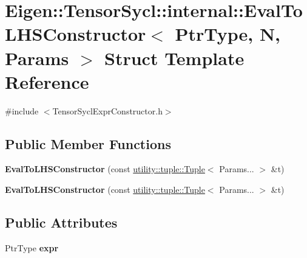 \hypertarget{struct_eigen_1_1_tensor_sycl_1_1internal_1_1_eval_to_l_h_s_constructor}{}\section{Eigen\+:\+:Tensor\+Sycl\+:\+:internal\+:\+:Eval\+To\+L\+H\+S\+Constructor$<$ Ptr\+Type, N, Params $>$ Struct Template Reference}
\label{struct_eigen_1_1_tensor_sycl_1_1internal_1_1_eval_to_l_h_s_constructor}


{\ttfamily \#include $<$Tensor\+Sycl\+Expr\+Constructor.\+h$>$}

\subsection*{Public Member Functions}
\begin{DoxyCompactItemize}
\item 
\mbox{\label{struct_eigen_1_1_tensor_sycl_1_1internal_1_1_eval_to_l_h_s_constructor_a78dfdb034a54038d757bf0cc6db8647e}} 
{\bfseries Eval\+To\+L\+H\+S\+Constructor} (const \hyperlink{structutility_1_1tuple_1_1_tuple}{utility\+::tuple\+::\+Tuple}$<$ Params... $>$ \&t)
\item 
\mbox{\label{struct_eigen_1_1_tensor_sycl_1_1internal_1_1_eval_to_l_h_s_constructor_a78dfdb034a54038d757bf0cc6db8647e}} 
{\bfseries Eval\+To\+L\+H\+S\+Constructor} (const \hyperlink{structutility_1_1tuple_1_1_tuple}{utility\+::tuple\+::\+Tuple}$<$ Params... $>$ \&t)
\end{DoxyCompactItemize}
\subsection*{Public Attributes}
\begin{DoxyCompactItemize}
\item 
\mbox{\label{struct_eigen_1_1_tensor_sycl_1_1internal_1_1_eval_to_l_h_s_constructor_ac2696513c08bf6b4d2c8985a0fbe2c89}} 
Ptr\+Type {\bfseries expr}
\end{DoxyCompactItemize}


